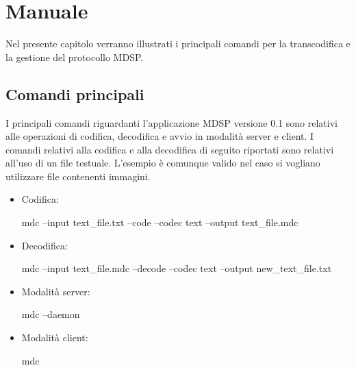 \chapter{Manuale}
Nel presente capitolo verranno illustrati i principali comandi per la
transcodifica e la gestione del protocollo MDSP.

\section{Comandi principali}
I principali comandi riguardanti l'applicazione MDSP versione 0.1 sono relativi
alle operazioni di codifica, decodifica e avvio in modalità server e client. I
comandi relativi alla codifica e alla decodifica di seguito riportati sono
relativi all'uso di un file testuale. L'esempio è comunque valido nel caso si
vogliano utilizzare file contenenti immagini.

\begin{itemize}
  \item Codifica: \begin{code} mdc --input text\_file.txt --code --codec text
  --output text\_file.mdc \end{code}
  \item Decodifica: \begin{code} mdc --input text\_file.mdc --decode --codec
  text --output new\_text\_file.txt \end{code}
  \item Modalità server: \begin{code} mdc --daemon \end{code}
  \item Modalità client: \begin{code} mdc \end{code}
\end{itemize}


